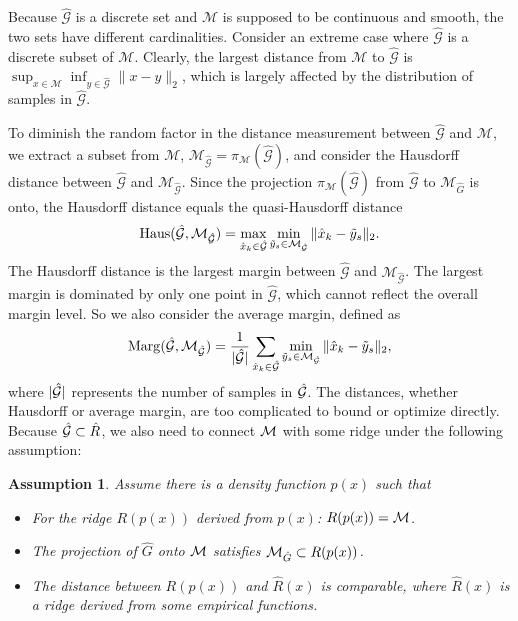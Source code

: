 \documentclass[aos,preprint]{imsart}
\newcommand{\Yao}[1]{{\textcolor{red}{[Yao: #1]}}}%
\newtheorem{assumption}[theorem]{Assumption}
\theoremstyle{remark}
\begin{document}
Because $\hat{\mathcal G}$ is a discrete set and $\mathcal M$ is supposed to be continuous and smooth, the two sets have different cardinalities. Consider an extreme case where $\hat{\mathcal G}$ is a discrete subset of $\mathcal M$. Clearly, the largest distance from $\mathcal M$ to $\hat{\mathcal G}$ is $\sup_{x\in \mathcal M}\inf_{y\in\hat{\mathcal G}} \|x-y\|_2$, which is largely affected by the distribution of samples in $\hat{\mathcal G}$.

To diminish the random factor in the distance measurement between $\hat{\mathcal G}$ and $\mathcal M$, we extract a subset from $\mathcal M$, ${\mathcal M}_{\hat{\mathcal G}}=\pi_{\mathcal M}(\hat{\mathcal G})$, and consider the Hausdorff distance between ${\hat{\mathcal G}}$ and ${\mathcal M}_{\hat{\mathcal G}}$. Since the projection $\pi_{\mathcal M}(\hat{\mathcal G})$ from $\hat{\mathcal G}$ to $\mathcal M_{\hat{G}}$ is onto, the Hausdorff distance equals the quasi-Hausdorff distance
\begin{equation}\label{Hausd}
{\rm Haus}({\hat{\mathcal G}}, {\mathcal M}_{\hat{\mathcal G}}) = \max_{\hat{x}_k\in \hat{\mathcal G}} \min_{\tilde{y}_s\in {\mathcal M}_{\hat{\mathcal G}}}\|\hat{x}_k-\tilde{y}_s\|_2.
\end{equation}
The Hausdorff distance is the largest margin between $\hat{\mathcal G}$ and ${\mathcal M}_{\hat{\mathcal G}}$. The largest margin is dominated by only one point in $\hat{\mathcal G}$, which cannot reflect the overall margin level. So we also consider the average margin, defined as
\begin{equation}\label{margin}
{\rm Marg}({\hat{\mathcal G}, {\mathcal M}_{\hat{\mathcal G}}}) = \frac{1}{|\hat{\mathcal G}|} \sum_{\hat{x}_k\in \hat{\mathcal G}} \min_{\tilde{y}_s\in {\mathcal M}_{\hat{\mathcal G}}}\|\hat{x}_k-\tilde{y}_s\|_2,
\end{equation}
where $|\cal \hat{G}|$ represents the number of samples in $\cal \hat{G}$.
The distances, whether Hausdorff or average margin, are too complicated to bound or optimize directly. Because $\hat{\cal G}\subset \hat{R}$,  we also need to connect $\cal M$ with some ridge under the following assumption:
\begin{assumption}\label{Data_assumption}
Assume there is a density function $p(x)$ such that 
\begin{itemize}
\item[1.] For the ridge $R(p(x))$ derived from $p(x)$: $R(p(x))={\cal M}$.
\item[2.] The projection of $\hat{G}$ onto ${\cal M}$ satisfies ${\cal M}_{\hat{G}}\subset R(p(x))$.
\item[3.] The distance between $R(p(x))$ and $\hat{R}(x)$ is comparable, where $\hat{R}(x)$ is a ridge derived from some empirical functions.
\end{itemize}
\end{assumption}
\end{document}
